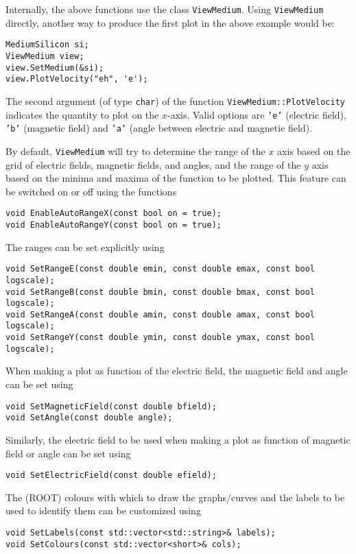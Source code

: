 Internally, the above functions use the class \texttt{ViewMedium}. 
Using \texttt{ViewMedium} directly, another way to produce the first plot 
in the above example would be:
\begin{lstlisting}
MediumSilicon si;
ViewMedium view;
view.SetMedium(&si);
view.PlotVelocity("eh", 'e');
\end{lstlisting}
The second argument (of type \texttt{char}) of the function \texttt{ViewMedium::PlotVelocity} indicates the quantity to plot on the $x$-axis. 
Valid options are \texttt{'e'} (electric field), \texttt{'b'} (magnetic field) and \texttt{'a'} (angle between electric and magnetic field). 

By default, \texttt{ViewMedium} will try to determine the range of the 
$x$ axis based on the grid of electric fields, magnetic fields, 
and angles, and the range of the $y$ axis based on the 
minima and maxima of the function to be plotted. This feature can be 
switched on or off using the functions
\begin{lstlisting}
void EnableAutoRangeX(const bool on = true);
void EnableAutoRangeY(const bool on = true);
\end{lstlisting}
The ranges can be set explicitly using
\begin{lstlisting}
void SetRangeE(const double emin, const double emax, const bool logscale);
void SetRangeB(const double bmin, const double bmax, const bool logscale);
void SetRangeA(const double amin, const double amax, const bool logscale);
void SetRangeY(const double ymin, const double ymax, const bool logscale);
\end{lstlisting}
When making a plot as function of the electric field, the magnetic field 
and angle can be set using
\begin{lstlisting}
void SetMagneticField(const double bfield);
void SetAngle(const double angle);
\end{lstlisting}
Similarly, the electric field to be used when making a plot as 
function of magnetic field or angle can be set using
\begin{lstlisting}
void SetElectricField(const double efield);
\end{lstlisting}

The (ROOT) colours with which to draw the graphs/curves and the labels
to be used to identify them can be customized using
\begin{lstlisting}
void SetLabels(const std::vector<std::string>& labels);
void SetColours(const std::vector<short>& cols);
\end{lstlisting}

